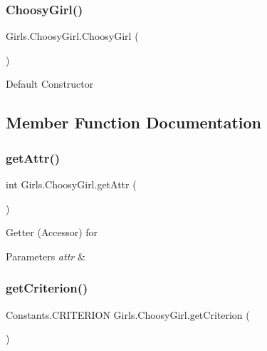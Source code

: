 \subsubsection{\texorpdfstring{Choosy\+Girl()}{ChoosyGirl()}\hspace{0.1cm}{\footnotesize\ttfamily [2/2]}}
{\footnotesize\ttfamily Girls.\+Choosy\+Girl.\+Choosy\+Girl (\begin{DoxyParamCaption}{ }\end{DoxyParamCaption})\hspace{0.3cm}{\ttfamily [inline]}}

Default Constructor 

\subsection{Member Function Documentation}
\mbox{\label{class_girls_1_1_choosy_girl_a86850997d141237b2cffb18af4a07c11}} 
\subsubsection{\texorpdfstring{get\+Attr()}{getAttr()}}
{\footnotesize\ttfamily int Girls.\+Choosy\+Girl.\+get\+Attr (\begin{DoxyParamCaption}{ }\end{DoxyParamCaption})\hspace{0.3cm}{\ttfamily [inline]}}

Getter (Accessor) for 
\begin{DoxyParams}{Parameters}
{\em attr} & \\
\hline
\end{DoxyParams}
\mbox{\label{class_girls_1_1_choosy_girl_a2fc874b64673cd3da84a3fed95795586}} 
\subsubsection{\texorpdfstring{get\+Criterion()}{getCriterion()}}
{\footnotesize\ttfamily Constants.\+C\+R\+I\+T\+E\+R\+I\+ON Girls.\+Choosy\+Girl.\+get\+Criterion (\begin{DoxyParamCaption}{ }\end{DoxyParamCaption})\hspace{0.3cm}{\ttfamily [inline]}}

